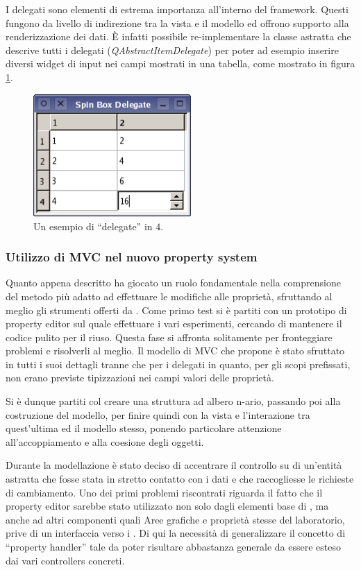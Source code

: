 I delegati sono elementi di estrema importanza all'interno del framework. Questi fungono da livello di indirezione tra la vista e il modello ed offrono supporto alla renderizzazione dei dati. È infatti possibile re-implementare la classe astratta che descrive tutti i delegati (\emph{QAbstractItemDelegate}) per poter ad esempio inserire diversi widget di input nei campi mostrati in una tabella, come mostrato in figura \ref{figura:qt_delegate}.

\begin{figure}[!htb]
	\centering
	\includegraphics[width=6cm]{images/spinboxdelegate-example.png}
	\caption{Un esempio di ``delegate'' in \qt{}$4$.}
	\label{figura:qt_delegate}
\end{figure}

\subsubsection*{Utilizzo di MVC nel nuovo property system}
Quanto appena descritto ha giocato un ruolo fondamentale nella comprensione del metodo più adatto ad effettuare le modifiche alle proprietà, sfruttando al meglio gli strumenti offerti da \qt{}. Come primo test si è partiti con un prototipo di property editor sul quale effettuare i vari esperimenti, cercando di mantenere il codice pulito per il riuso.
Questa fase si affronta solitamente per fronteggiare problemi e risolverli al meglio. Il modello di MVC che \qt{} propone è stato sfruttato in tutti i suoi dettagli tranne che per i delegati in quanto, per gli scopi prefissati, non erano previste tipizzazioni nei campi valori delle proprietà.

Si è dunque partiti col creare una struttura ad albero n-ario, passando poi alla costruzione del modello, per finire quindi con la vista e l'interazione tra quest'ultima ed il modello stesso, ponendo particolare attenzione all'accoppiamento e alla coesione degli oggetti.

Durante la modellazione è stato deciso di accentrare il controllo su di un'entità astratta che fosse stata in stretto contatto con i dati e che raccogliesse le richieste di cambiamento. Uno dei primi problemi riscontrati riguarda il fatto che il property editor sarebbe stato utilizzato non solo dagli elementi base di \visualnetkit{}, ma anche ad altri componenti quali Aree grafiche e proprietà stesse del laboratorio, prive di un interfaccia verso i \plugin{}. Di qui la necessità di generalizzare il concetto di ``property handler'' tale da poter risultare abbastanza generale da essere esteso dai vari controllers concreti.

